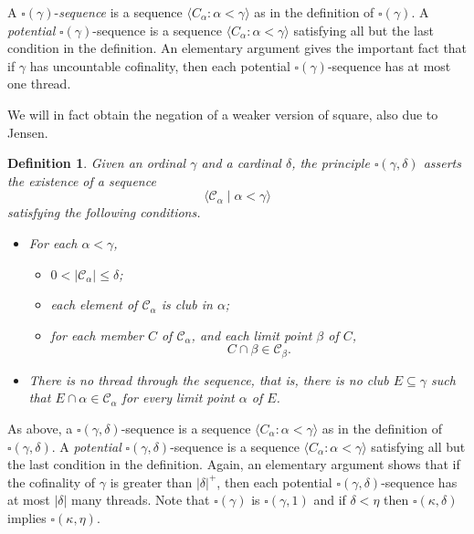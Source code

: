 \documentclass[12pt]{article}
\newtheorem{definition}[theorem]{Definition}
\begin{document}
A $\square(\gamma)$-\emph{sequence} is a sequence $\langle C_{\alpha} : \alpha < \gamma \rangle$ as in the definition of $\square(\gamma)$.
A \emph{potential} $\square(\gamma)$-sequence is a sequence $\langle C_{\alpha} : \alpha < \gamma \rangle$ satisfying all but the last condition in the definition.  An elementary argument gives the important fact that if $\gamma$ has uncountable cofinality, then each potential $\square(\gamma)$-sequence has at most one thread.

We will in fact obtain the negation of a weaker version of square, also due to Jensen.


\begin{definition} Given an ordinal $\gamma$ and a cardinal $\delta$, the principle $\square(\gamma, \delta)$ asserts
the existence of a sequence \[\langle \mathcal{C}_{\alpha} \mid \alpha < \gamma \rangle\] satisfying the following conditions.
\begin{itemize}
\item
For each $\alpha < \gamma$,
\begin{itemize}
\item
$0 < |\mathcal{C}_{\alpha}| \leq \delta$;
\item
each element of $\mathcal{C}_{\alpha}$ is club in $\alpha$;
\item
for each member $C$ of $\mathcal{C}_{\alpha}$, and each limit point $\beta$ of $C$, \[C \cap
\beta \in\mathcal{C}_{\beta}.\]
\end{itemize}
\item
There is no thread through the sequence, that is, there is no club $E \subseteq
\gamma$ such that $E \cap \alpha \in \mathcal{C}_{\alpha}$ for every limit point $\alpha$ of $E$.
\end{itemize}
\end{definition}

As above, a $\square(\gamma,\delta)$-sequence is a sequence $\langle C_{\alpha} : \alpha < \gamma \rangle$ as in the definition of $\square(\gamma, \delta)$. A \emph{potential} $\square(\gamma,\delta)$-sequence is a sequence $\langle C_{\alpha} : \alpha < \gamma \rangle$ satisfying all but the last condition in the definition. Again, an elementary argument shows that if the cofinality of $\gamma$ is greater than $|\delta|^{+}$, then each potential $\square(\gamma, \delta)$-sequence has at most $|\delta|$ many threads.
Note that $\square(\gamma)$ is $\square(\gamma, 1)$ and if $\delta < \eta$ then $\square(\kappa, \delta)$ implies $\square(\kappa, \eta)$.
\end{document}
